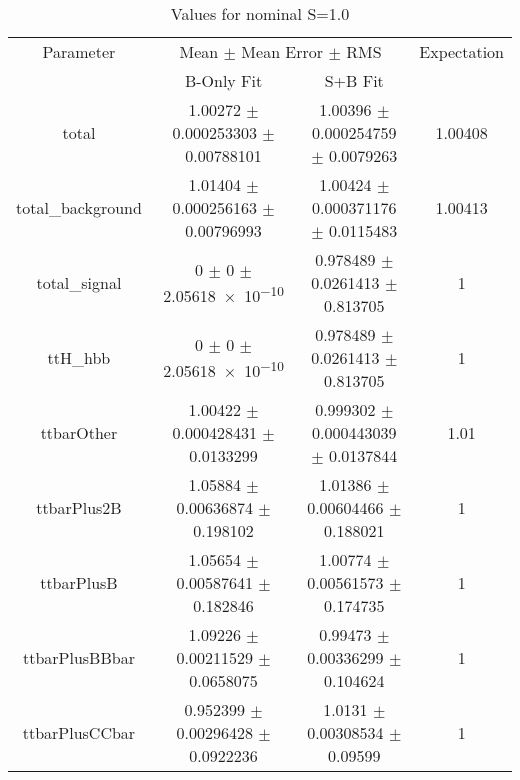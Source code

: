 \begin{table}
\centering
\caption{Values for nominal S=1.0}
\begin{tabular}{cccc}
\toprule
Parameter & \multicolumn{2}{c}{Mean $\pm$ Mean Error $\pm$ RMS} & Expectation\\
 & B-Only Fit & S+B Fit & \\
\midrule
total & \num{1.00272} $\pm$ \num{0.000253303} $\pm$ \num{0.00788101} & \num{1.00396} $\pm$ \num{0.000254759} $\pm$ \num{0.0079263} & \num{1.00408}\\
total\_background & \num{1.01404} $\pm$ \num{0.000256163} $\pm$ \num{0.00796993} & \num{1.00424} $\pm$ \num{0.000371176} $\pm$ \num{0.0115483} & \num{1.00413}\\
total\_signal & \num{0} $\pm$ \num{0} $\pm$ \num{2.05618e-10} & \num{0.978489} $\pm$ \num{0.0261413} $\pm$ \num{0.813705} & \num{1}\\
ttH\_hbb & \num{0} $\pm$ \num{0} $\pm$ \num{2.05618e-10} & \num{0.978489} $\pm$ \num{0.0261413} $\pm$ \num{0.813705} & \num{1}\\
ttbarOther & \num{1.00422} $\pm$ \num{0.000428431} $\pm$ \num{0.0133299} & \num{0.999302} $\pm$ \num{0.000443039} $\pm$ \num{0.0137844} & \num{1.01}\\
ttbarPlus2B & \num{1.05884} $\pm$ \num{0.00636874} $\pm$ \num{0.198102} & \num{1.01386} $\pm$ \num{0.00604466} $\pm$ \num{0.188021} & \num{1}\\
ttbarPlusB & \num{1.05654} $\pm$ \num{0.00587641} $\pm$ \num{0.182846} & \num{1.00774} $\pm$ \num{0.00561573} $\pm$ \num{0.174735} & \num{1}\\
ttbarPlusBBbar & \num{1.09226} $\pm$ \num{0.00211529} $\pm$ \num{0.0658075} & \num{0.99473} $\pm$ \num{0.00336299} $\pm$ \num{0.104624} & \num{1}\\
ttbarPlusCCbar & \num{0.952399} $\pm$ \num{0.00296428} $\pm$ \num{0.0922236} & \num{1.0131} $\pm$ \num{0.00308534} $\pm$ \num{0.09599} & \num{1}\\
\bottomrule
\end{tabular}
\end{table}